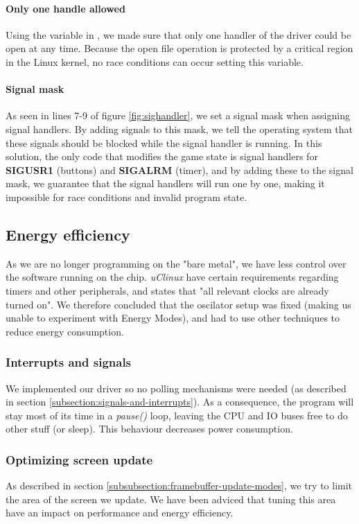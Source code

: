 \paragraph{Only one handle allowed}
Using the  variable in , we made sure that only one handler of the driver could be open at any time. Because the open file operation is protected by a critical region in the Linux kernel, no race conditions can occur setting this variable.
\paragraph{Signal mask}
As seen in lines 7-9 of figure \ref{fig:sighandler}, we set a signal mask when assigning signal handlers. By adding signals to this mask, we tell the operating system that these signals should be blocked while the signal handler is running. In this solution, the only code that modifies the game state is signal handlers for \textbf{SIGUSR1} (buttons) and \textbf{SIGALRM} (timer), and by adding these to the signal mask, we guarantee that the signal handlers will run one by one, making it impossible for race conditions and invalid program state.

\subsection{Energy efficiency}
\label{subsection:energy-efficiency}
As we are no longer programming on the "bare metal", we have less control over the software running on the chip. \emph{uClinux} have certain requirements regarding timers and other peripherals, and \cite{compendium} states that "all relevant clocks are already turned on". We therefore concluded that the oscilator setup was fixed (making us unable to experiment with Energy Modes), and had to use other techniques to reduce energy consumption.

\subsubsection{Interrupts and signals}
We implemented our driver so no polling mechanisms were needed (as described in section \ref{subsection:signals-and-interrupts}). As a consequence, the program will stay most of its time in a \emph{pause()} loop, leaving the CPU and IO buses free to do other stuff (or  sleep). This behaviour decreases power consumption.

\subsubsection{Optimizing screen update}
As described in section \ref{subsubsection:framebuffer-update-modes}, we try to limit the area of the screen we update. We have been adviced that tuning this area have an impact on performance and energy efficiency.

